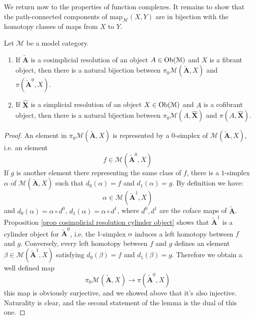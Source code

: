 \begin{refsection}
We return now to the properties of function complexes. It remains to show that the path-connected components of $\mathrm{map}_{\mathcal M}(X,Y)$ are in bijection with the homotopy classes of maps from $X$ to $Y$.

\begin{lemma} \label{lemma path component function complexes}
Let $\mathcal M$ be a model category.
\begin{enumerate}
\item If $\widetilde{\mathbf A}$ is a cosimplicial resolution of an object $A \in \operatorname{Ob}(\mathcal M)$ and $X$ is a fibrant object, then there is a natural bijection between $\pi_0 \mathcal M( \widetilde{\mathbf A}, X)$ and $\pi(\widetilde{\mathbf A}^0, X)$.
\item If $\widehat{\mathbf X}$ is a simplicial resolution of an object $X \in \operatorname{Ob}(\mathcal M)$ and $A$ is a cofibrant object, then there is a natural bijection between $\pi_0 \mathcal M(A, \widehat{\mathbf X})$ and $\pi(A, \widehat{\mathbf X})$.
\end{enumerate}
\end{lemma}

\begin{proof}
An element in $\pi_0 \mathcal M(\widetilde{\mathbf A},X)$ is represented by a $0$-simplex of $\mathcal M(\widetilde{\mathbf A},X)$, i.e. an element
\[
f \in \mathcal M (\widetilde{\mathbf A}^0, X)
\]
If $g$ is another element there representing the same class of $f$, there is a $1$-simplex $\alpha$ of $\mathcal M(\widetilde{\mathbf A}, X)$ such that $d_0(\alpha) = f$ and $d_1(\alpha) = g$. By definition we have:
\[
\alpha \in \mathcal M(\widetilde{\mathbf A}^1, X)
\]
and $d_0(\alpha) = \alpha \circ d^0$, $d_1(\alpha) = \alpha \circ d^1$, where $d^0,d^1$ are the coface maps of $\widetilde{\mathbf A}$. Proposition \ref{prop cosimplicial resolution cylinder object} shows that $\widetilde{\mathbf A}^1$ is a cylinder object for $\widetilde{\mathbf A}^0$, i.e. the $1$-simplex $\alpha$ induces a left homotopy between $f$ and $g$. Conversely, every left homotopy between $f$ and $g$ defines an element $\beta \in \mathcal M(\widetilde{\mathbf A}^1,X)$ satisfying $d_0(\beta) = f$ and $d_1(\beta) = g$. Therefore we obtain a well defined map
\[
\pi_0 \mathcal M(\widetilde{\mathbf A}, X) \to \pi(\widetilde{\mathbf A}^0,X)
\]
this map is obviously surjective, and we showed above that it's also injective. Naturality is clear, and the second statement of the lemma is the dual of this one.
\end{proof}


\end{refsection}
